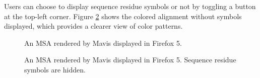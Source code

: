 Users can choose to display sequence residue symbols or not by toggling a button at the top-left corner. Figure \ref{fig:chap4_mavis2} shows the colored alignment without symbols displayed, which provides a clearer view of color patterns.

\begin{landscape}
\begin{figure}[p]
\caption[Web User Interface with Symbols]{An MSA rendered by Mavis displayed in Firefox 5.}\label{fig:chap4_mavis}
\end{figure}
\end{landscape}

\begin{landscape}
\begin{figure}[p]
\caption[Web User Interface without Symbols]{An MSA rendered by Mavis displayed in Firefox 5. Sequence residue symbols are hidden.}\label{fig:chap4_mavis2}
\end{figure}
\end{landscape}